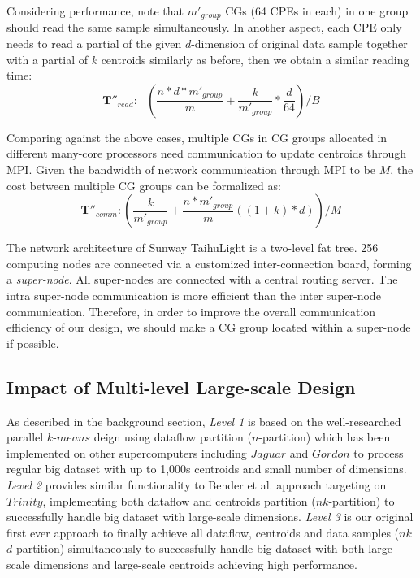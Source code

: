 Considering performance, note that $m'_{group}$ CGs (64 CPEs in each) in one group should read the same sample simultaneously. In another aspect, each CPE only needs to read a partial of the given $d$-dimension of original data sample together with  a partial of $k$ centroids similarly as before, then we obtain a similar reading time:  
$$\mathbf{T''}_{read}:\ \ \ (\frac{n*d*m'_{group}}{m}+\frac{k}{m'_{group}}*\frac{d}{64})/B$$

Comparing against the above cases, multiple CGs in CG groups allocated in different many-core processors need communication to update centroids through MPI. Given the bandwidth of network communication through MPI to be $M$, the cost between multiple CG groups can be formalized as:
$$\mathbf{T''}_{comm}: (\frac{k}{m'_{group}}+\frac{n*m'_{group}}{m}((1+k)*d))/M $$

The network architecture of Sunway TaihuLight is a two-level fat tree. 256 computing nodes are connected via a customized inter-connection board, forming a \emph{super-node}. All super-nodes are connected with a central routing server. The intra super-node communication is more efficient than the inter super-node communication. Therefore, in order to improve the overall communication efficiency of our design, we should make a CG group located within a super-node if possible. 


\subsection{Impact of Multi-level Large-scale Design}
As described in the background section,  \textit{Level 1} is based on the well-researched parallel $k$-$means$ deign  using dataflow partition ($n$-partition) which has been implemented on other supercomputers including $Jaguar$ \cite{kumar2011parallel} and $Gordon$ \cite{cai2015grouping} to process regular big dataset with up to 1,000s centroids and small number of dimensions. \textit{Level 2} provides similar functionality to Bender et al. \cite{bender2015k} approach targeting on $Trinity$, implementing both dataflow and centroids partition ($n$$k$-partition) to successfully handle big dataset with large-scale dimensions. \textit{Level 3} is our original first ever approach to finally achieve all dataflow, centroids and data samples ($n$$k$$d$-partition) simultaneously to successfully handle big dataset with both large-scale dimensions and large-scale centroids achieving high performance.  

